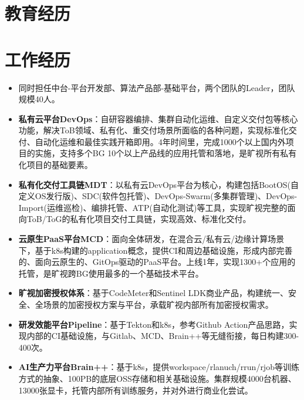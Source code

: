 \documentclass{resume}
\begin{document}



\section{教育经历}

\section{工作经历}
\begin{itemize}
	\item 同时担任中台-平台开发部、算法产品部-基础平台，两个团队的Leader，团队规模40人。
\end{itemize}
\begin{itemize}
  \item \textbf{私有云平台DevOps}：自研容器编排、集群自动化运维、自定义交付包等核心功能，解决ToB领域、私有化、重交付场景所面临的各种问题，实现标准化交付、自动化运维和最佳实践开箱即用。4年时间里，完成1000个以上国内外项目的实施，支持多个BG 10个以上产品线的应用托管和落地，是旷视所有私有化项目的基础要素。
	\item \textbf{私有化交付工具链MDT}：以私有云DevOps平台为核心，构建包括BootOS(自定义OS发行版)、SDC(软件包托管)、DevOps-Swarm(多集群管理)、DevOps-Import(运维巡检)、编排托管、ATP(自动化测试)等工具，实现旷视完整的面向ToB/ToG的私有化项目交付工具链，实现高效、标准化交付。
  \item \textbf{云原生PaaS平台MCD}：面向全体研发，在混合云/私有云/边缘计算场景下，基于k8s构建的application概念，提供CI和周边基础设施，形成内部完善的、面向云原生的、GitOps驱动的PaaS平台。上线1年，实现1300+个应用的托管，是旷视跨BG使用最多的一个基础技术平台。
  \item \textbf{旷视加密授权体系}：基于CodeMeter和Sentinel LDK商业产品，构建统一、安全、全场景的加密授权方案与平台，承载旷视内部所有加密授权需求。
  \item \textbf{研发效能平台Pipeline}：基于Tekton和k8s，参考Github Action产品思路，实现内部的CI基础设施，与Gitlab、MCD、Brain++等无缝衔接，每日构建300-400次。
  \item \textbf{AI生产力平台Brain++}：基于k8s，提供workspace/rlanuch/rrun/rjob等训练方式的抽象、100PB的底层OSS存储和相关基础设施。集群规模4000台机器、13000张显卡，托管内部所有训练服务，并对外进行商业化尝试。
\end{itemize}
\end{document}
